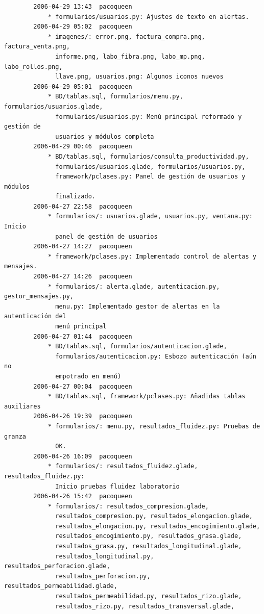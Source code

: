 \documentclass[a4paper]{article}
\begin{document}
\begin{verbatim}
        2006-04-29 13:43  pacoqueen
            * formularios/usuarios.py: Ajustes de texto en alertas.
        2006-04-29 05:02  pacoqueen
            * imagenes/: error.png, factura_compra.png, factura_venta.png,
              informe.png, labo_fibra.png, labo_mp.png, labo_rollos.png,
              llave.png, usuarios.png: Algunos iconos nuevos
        2006-04-29 05:01  pacoqueen
            * BD/tablas.sql, formularios/menu.py, formularios/usuarios.glade,
              formularios/usuarios.py: Menú principal reformado y gestión de
              usuarios y módulos completa
        2006-04-29 00:46  pacoqueen
            * BD/tablas.sql, formularios/consulta_productividad.py,
              formularios/usuarios.glade, formularios/usuarios.py,
              framework/pclases.py: Panel de gestión de usuarios y módulos
              finalizado.
        2006-04-27 22:58  pacoqueen
            * formularios/: usuarios.glade, usuarios.py, ventana.py: Inicio
              panel de gestión de usuarios
        2006-04-27 14:27  pacoqueen
            * framework/pclases.py: Implementado control de alertas y mensajes.
        2006-04-27 14:26  pacoqueen
            * formularios/: alerta.glade, autenticacion.py, gestor_mensajes.py,
              menu.py: Implementado gestor de alertas en la autenticación del
              menú principal
        2006-04-27 01:44  pacoqueen
            * BD/tablas.sql, formularios/autenticacion.glade,
              formularios/autenticacion.py: Esbozo autenticación (aún no
              empotrado en menú)
        2006-04-27 00:04  pacoqueen
            * BD/tablas.sql, framework/pclases.py: Añadidas tablas auxiliares
        2006-04-26 19:39  pacoqueen
            * formularios/: menu.py, resultados_fluidez.py: Pruebas de granza
              OK.
        2006-04-26 16:09  pacoqueen
            * formularios/: resultados_fluidez.glade, resultados_fluidez.py:
              Inicio pruebas fluidez laboratorio
        2006-04-26 15:42  pacoqueen
            * formularios/: resultados_compresion.glade,
              resultados_compresion.py, resultados_elongacion.glade,
              resultados_elongacion.py, resultados_encogimiento.glade,
              resultados_encogimiento.py, resultados_grasa.glade,
              resultados_grasa.py, resultados_longitudinal.glade,
              resultados_longitudinal.py, resultados_perforacion.glade,
              resultados_perforacion.py, resultados_permeabilidad.glade,
              resultados_permeabilidad.py, resultados_rizo.glade,
              resultados_rizo.py, resultados_transversal.glade,

\end{verbatim}
\end{document}
